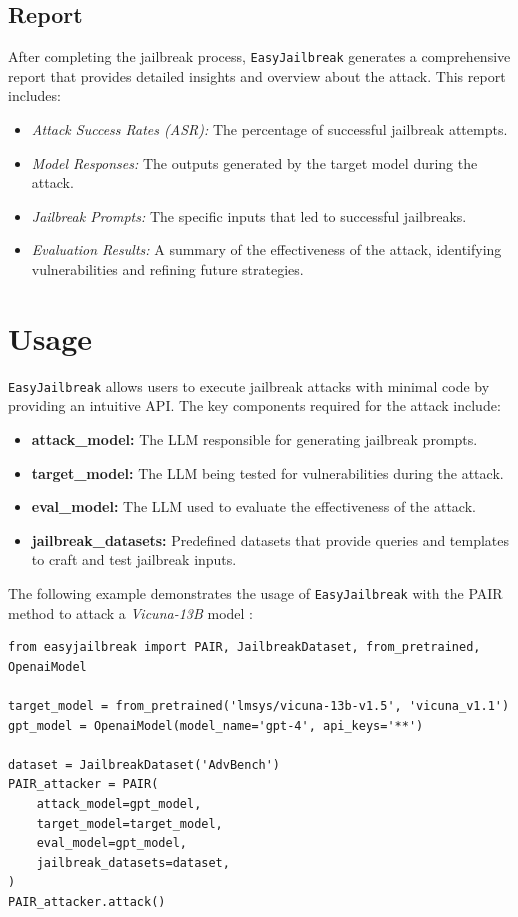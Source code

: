 \documentclass[18pt]{article}
\begin{document}
\subsection{Report}
After completing the jailbreak process, \texttt{EasyJailbreak} generates a comprehensive report that provides detailed insights and overview about the attack. This report includes:
\begin{itemize}
    \item \textit{Attack Success Rates (ASR):} The percentage of successful jailbreak attempts.
    \item \textit{Model Responses:} The outputs generated by the target model during the attack.
    \item \textit{Jailbreak Prompts:} The specific inputs that led to successful jailbreaks.
    \item \textit{Evaluation Results:} A summary of the effectiveness of the attack, identifying vulnerabilities and refining future strategies.
\end{itemize}

	
\section{Usage}

\texttt{EasyJailbreak} allows users to execute jailbreak attacks with minimal code by providing an intuitive API. The key components required for the attack include:

\begin{itemize}
    \item \textbf{attack\_model:} The LLM responsible for generating jailbreak prompts.
    \item \textbf{target\_model:} The LLM being tested for vulnerabilities during the attack.
    \item \textbf{eval\_model:} The LLM used to evaluate the effectiveness of the attack.
    \item \textbf{jailbreak\_datasets:} Predefined datasets that provide queries and templates to craft and test jailbreak inputs.
\end{itemize}

\noindent The following example demonstrates the usage of \texttt{EasyJailbreak} with the PAIR method \cite{pair} to attack a \textit{Vicuna-13B} model \cite{vicuna}:

\begin{verbatim}
from easyjailbreak import PAIR, JailbreakDataset, from_pretrained, OpenaiModel

target_model = from_pretrained('lmsys/vicuna-13b-v1.5', 'vicuna_v1.1')
gpt_model = OpenaiModel(model_name='gpt-4', api_keys='**')

dataset = JailbreakDataset('AdvBench')
PAIR_attacker = PAIR(
    attack_model=gpt_model,
    target_model=target_model,
    eval_model=gpt_model,
    jailbreak_datasets=dataset,
)
PAIR_attacker.attack()
\end{verbatim}
\end{document}
